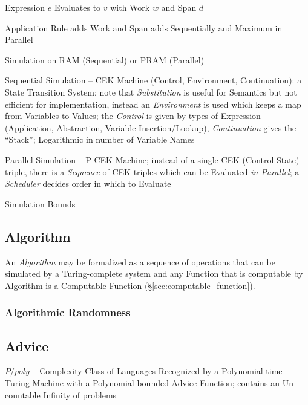 Expression $e$ Evaluates to $v$ with Work $w$ and Span $d$

Application Rule adds Work and Span adds Sequentially and Maximum in Parallel

Simulation on RAM (Sequential) or PRAM (Parallel)

Sequential Simulation -- CEK Machine (Control, Environment, Continuation): a
State Transition System; note that \emph{Substitution} is useful for Semantics
but not efficient for implementation, instead an \emph{Environment} is used
which keeps a map from Variables to Values; the \emph{Control} is given by types
of Expression (Application, Abstraction, Variable Insertion/Lookup),
\emph{Continuation} gives the ``Stack''; Logarithmic in number
of Variable Names

Parallel Simulation -- P-CEK Machine; instead of a single CEK (Control State)
triple, there is a \emph{Sequence} of CEK-triples which can be Evaluated
\emph{in Parallel}; a \emph{Scheduler} decides order in which to Evaluate

Simulation Bounds



\subsection{Algorithm}\label{sec:algorithm}

An \emph{Algorithm} may be formalized as a sequence of operations that
can be simulated by a Turing-complete system and any Function that is
computable by Algorithm is a Computable Function
(\S\ref{sec:computable_function}).



\subsubsection{Algorithmic Randomness}\label{sec:algorithmic_randomness}



\subsection{Advice}\label{sec:advice}

$P/poly$ -- Complexity Class of Languages Recognized by a Polynomial-time Turing
Machine with a Polynomial-bounded Advice Function; contains an Un-countable
Infinity of problems



